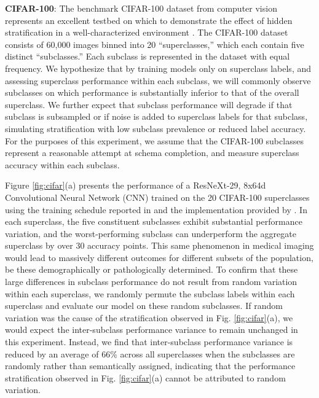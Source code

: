 \documentclass[sigconf]{acmart}
\begin{document}
\textbf{CIFAR-100}: The benchmark CIFAR-100 dataset from computer vision represents an excellent testbed on which to demonstrate the effect of hidden stratification in a well-characterized environment \citep{Krizhevsky2009-tq}.  
The CIFAR-100 dataset consists of 60,000 images binned into 20 ``superclasses,'' which each contain five distinct ``subclasses.'' 
 Each subclass is represented in the dataset with equal frequency.  
 We hypothesize that by training models only on superclass labels, and assessing superclass performance within each subclass, we will commonly observe subclasses on which performance is substantially inferior to that of the overall superclass.  
  We further expect that subclass performance will degrade if that subclass is subsampled or if noise is added to superclass labels for that subclass, simulating stratification with low subclass prevalence or reduced label accuracy.
 For the purposes of this experiment, we assume that the CIFAR-100 subclasses represent a reasonable attempt at schema completion, and measure superclass accuracy within each subclass.
 
 Figure \ref{fig:cifar}(a) presents the performance of a ResNeXt-29, 8x64d Convolutional Neural Network (CNN) trained on the 20 CIFAR-100 superclasses using the training schedule reported in \citep{Xie2016-ip} and the implementation provided by \citep{Yang_undated-bt}.  
In each superclass, the five constituent subclasses exhibit substantial performance variation, and the worst-performing subclass can underperform the aggregate superclass by over 30 accuracy points.  
This same phenomenon in medical imaging would lead to massively different outcomes for different subsets of the population, be these demographically or pathologically determined.
To confirm that these large differences in subclass performance do not result from random variation within each superclass, we randomly permute the subclass labels within each superclass and evaluate our model on these random subclasses.
If random variation was the cause of the stratification observed in Fig. \ref{fig:cifar}(a), we would expect the inter-subclass performance variance to remain unchanged in this experiment.
 Instead, we find that inter-subclass performance variance is reduced by an average of 66\% across all superclasses when the subclasses are randomly rather than semantically assigned, indicating that the performance stratification observed in Fig. \ref{fig:cifar}(a) cannot be attributed to random variation.
\end{document}

